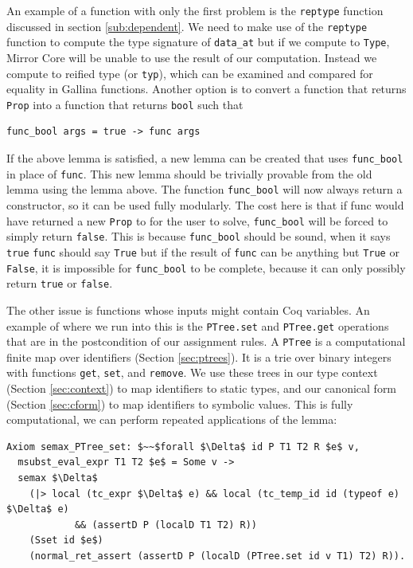 \documentclass{puthesis}
\begin{document}
An example of a function with only the first problem is the
\lstinline|reptype| function discussed in section
\ref{sub:dependent}. We need to make use of the \lstinline|reptype|
function to compute the type signature of \lstinline|data_at| but if we
compute to \lstinline|Type|, Mirror Core will be unable to use the
result of our computation. Instead we compute to reified type (or
\lstinline|typ|), which can be examined and compared for equality in
Gallina functions. Another option is to convert a function that
returns \lstinline|Prop| into a function that returns \lstinline|bool| such that

\begin{lstlisting}
func_bool args = true -> func args
\end{lstlisting}

If the above lemma is satisfied, a new lemma can be created that uses
\lstinline|func_bool| in place of \lstinline|func|. This new lemma
should be trivially provable from the old lemma using the lemma
above. The function \lstinline|func_bool| will now always return a
constructor, so it can be used fully modularly. The cost here is that
if func would have returned a new \lstinline|Prop| to for the user to
solve, \lstinline|func_bool| will be forced to simply return
\lstinline|false|. This is because \lstinline|func_bool| should be
sound, when it says \lstinline|true| \lstinline|func| should say
\lstinline|True| but if the result of \lstinline|func| can be anything
but \lstinline|True| or \lstinline|False|, it is impossible for
\lstinline|func_bool| to be complete, because it can only possibly
return \lstinline|true| or \lstinline|false|.

The other issue is functions whose inputs might contain Coq
variables. An example of where we run into this is the
\lstinline|PTree.set| and \lstinline|PTree.get| operations that are in
the postcondition of our assignment rules. A \lstinline|PTree| is a
computational finite map over identifiers (Section \ref{sec:ptrees}). It is a trie over binary
integers with functions \lstinline|get|, \lstinline|set|, and
\lstinline|remove|. We use these trees in our type context (Section
\ref{sec:context}) to map identifiers to static types, and our
canonical form (Section \ref{sec:cform}) to map identifiers to
symbolic values. This is fully computational, we can perform repeated
applications of the lemma:

\begin{lstlisting}
Axiom semax_PTree_set: $~~$forall $\Delta$ id P T1 T2 R $e$ v,
  msubst_eval_expr T1 T2 $e$ = Some v ->
  semax $\Delta$
    (|> local (tc_expr $\Delta$ e) && local (tc_temp_id id (typeof e) $\Delta$ e) 
            && (assertD P (localD T1 T2) R))
    (Sset id $e$)
    (normal_ret_assert (assertD P (localD (PTree.set id v T1) T2) R)).
\end{lstlisting}
\end{document}
